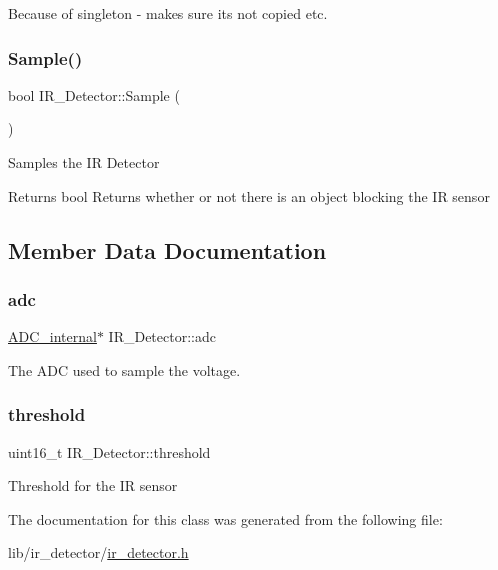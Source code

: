 Because of singleton -\/ makes sure its not copied etc. \hypertarget{class_i_r___detector_aca18cc0350105dfa2395cd2da6e8d05f}{}\label{class_i_r___detector_aca18cc0350105dfa2395cd2da6e8d05f} 
\subsubsection{\texorpdfstring{Sample()}{Sample()}}
{\footnotesize\ttfamily bool I\+R\+\_\+\+Detector\+::\+Sample (\begin{DoxyParamCaption}{ }\end{DoxyParamCaption})}

Samples the IR Detector \begin{DoxyReturn}{Returns}
bool Returns whether or not there is an object blocking the IR sensor 
\end{DoxyReturn}


\subsection{Member Data Documentation}
\hypertarget{class_i_r___detector_a33883224e6f643d3ece54a3c603b92e4}{}\label{class_i_r___detector_a33883224e6f643d3ece54a3c603b92e4} 
\subsubsection{\texorpdfstring{adc}{adc}}
{\footnotesize\ttfamily \hyperlink{class_a_d_c__internal}{A\+D\+C\+\_\+internal}$\ast$ I\+R\+\_\+\+Detector\+::adc\hspace{0.3cm}{\ttfamily [private]}}

The A\+DC used to sample the voltage. \hypertarget{class_i_r___detector_a8979f7f20da68ca44d7ea1fe43b2f986}{}\label{class_i_r___detector_a8979f7f20da68ca44d7ea1fe43b2f986} 
\subsubsection{\texorpdfstring{threshold}{threshold}}
{\footnotesize\ttfamily uint16\+\_\+t I\+R\+\_\+\+Detector\+::threshold\hspace{0.3cm}{\ttfamily [private]}}

Threshold for the IR sensor 

The documentation for this class was generated from the following file\+:\begin{DoxyCompactItemize}
\item 
lib/ir\+\_\+detector/\hyperlink{ir__detector_8h}{ir\+\_\+detector.\+h}\end{DoxyCompactItemize}
